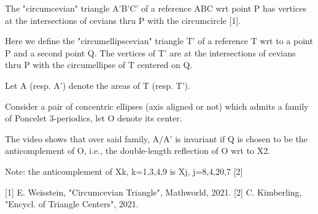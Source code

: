 The "circumcevian" triangle A'B'C' of a reference ABC wrt point P has vertices at the intersections of cevians thru P with the circumcircle [1].

Here we define the "circumellipscevian" triangle T' of a reference T wrt to a point P and a second point Q. The vertices of T' are at the intersections of cevians thru P with the circumellipse of T centered on Q.

Let A (resp. A') denote the areas of T (resp. T').

Consider a pair of concentric ellipses (axis aligned or not) which admits a family of Poncelet 3-periodics, let O denote its center.

The video shows that over said family, A/A' is invariant if Q is chosen to be the anticomplement of O, i.e., the double-length reflection of O wrt to X2.

Note: the anticomplement of Xk, k=1,3,4,9 is Xj, j=8,4,20,7 [2]

[1] E. Weisstein, "Circumcevian Triangle", Mathworld, 2021.
[2] C. Kimberling, "Encycl. of Triangle Centers", 2021.